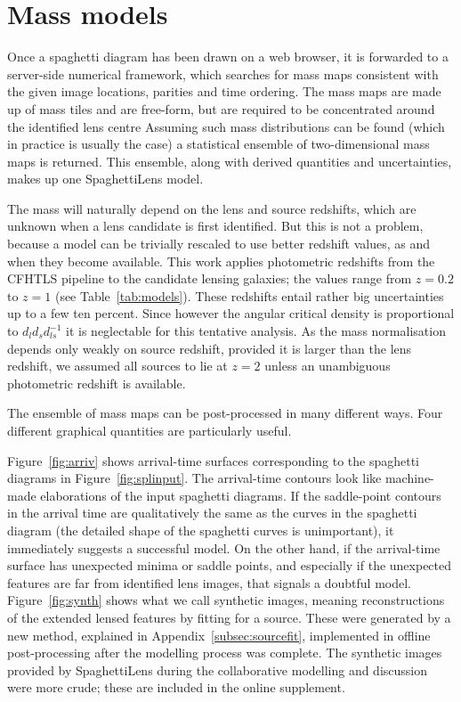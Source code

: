 \section{Mass models}\label{sec:massmodels}

Once a spaghetti diagram has been drawn on a web browser, it is
forwarded to a server-side numerical framework, which searches for
mass maps consistent with the given image locations, parities and time
ordering.  The mass maps are made up of mass tiles and are free-form,
but are required to be concentrated around the identified lens centre
\citep[see][for the precise formulation of the search
  problem.]{2014MNRAS.445.2181C} Assuming such mass distributions can
be found (which in practice is usually the case) a statistical
ensemble of two-dimensional mass maps is returned.  This ensemble,
along with derived quantities and uncertainties, makes up one
SpaghettiLens model.

The mass will naturally depend on the lens and source redshifts, which
are unknown when a lens candidate is first identified.  But this is
not a problem, because a model can be trivially rescaled to use better
redshift values, as and when they become available.  This work applies
photometric redshifts from the CFHTLS pipeline
\citep{2009A&A...500..981C}
to the candidate
lensing galaxies; the values range from $z=0.2$ to $z=1$ (see
Table~\ref{tab:models}).  
These redshifts entail rather big uncertainties up to a few ten percent.
Since however the angular critical density is proportional to $d_l d_s 
d_{ls}^{-1}$ \citep[consult Equation~A1 in][]{2015MNRAS.447.2170K} it is 
neglectable for this tentative analysis.
As the mass normalisation depends only weakly
on source redshift, provided it is larger than the lens redshift,
we assumed all sources to lie at $z=2$ unless an unambiguous photometric
redshift is available.

The ensemble of mass maps can be post-processed in many different
ways.  Four different graphical quantities are particularly useful.

Figure~\ref{fig:arriv} shows arrival-time surfaces corresponding to
the spaghetti diagrams in Figure~\ref{fig:splinput}.  The arrival-time
contours look like machine-made elaborations of the input spaghetti
diagrams.  If the saddle-point contours in the arrival time are
qualitatively the same as the curves in the spaghetti diagram (the
detailed shape of the spaghetti curves is unimportant), it immediately
suggests a successful model.  On the other hand, if the arrival-time
surface has unexpected minima or saddle points, and especially if the
unexpected features are far from identified lens images, that signals
a doubtful model.  Figure~\ref{fig:synth} shows what we call synthetic
images, meaning reconstructions of the extended lensed features by
fitting for a source.  These were generated by a new method, explained
in Appendix~\ref{subsec:sourcefit}, implemented in offline
post-processing after the modelling process was complete.  The
synthetic images provided by SpaghettiLens during the collaborative
modelling and discussion were more crude; these are included in the
online supplement.

